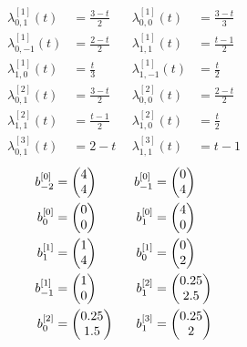 \begin{align}
	\lambda^{[1]}_{0,1}(t) &=  \frac{3-t}{2} ~~ &\lambda^{[1]}_{0,0}(t) &=  \frac{3-t}{3}\\
	\lambda^{[1]}_{0,-1}(t) &= \frac{2-t}{2} ~~ &\lambda^{[1]}_{1,1}(t) &=  \frac{t-1}{2}\\
	\lambda^{[1]}_{1,0}(t) &=  \frac{t}{3}   ~~ &\lambda^{[1]}_{1,-1}(t) &= \frac{t}{2}\\
	\lambda^{[2]}_{0,1}(t) &=  \frac{3-t}{2} ~~ &\lambda^{[2]}_{0,0}(t) &=  \frac{2-t}{2}\\
	\lambda^{[2]}_{1,1}(t) &=  \frac{t-1}{2} ~~ &\lambda^{[2]}_{1,0}(t) &=  \frac{t}{2}\\
	\lambda^{[3]}_{0,1}(t) &=  2-t           ~~ &\lambda^{[3]}_{1,1}(t) &=  t-1
\end{align}
\begin{align}
	b^{[0]}_{-2} &= \left( \begin{matrix}4 \\ 4\end{matrix}\right) ~~ &b^{[0]}_{-1} &= \left( \begin{matrix}0 \\ 4\end{matrix}\right)\\
	b^{[0]}_{0} &=  \left( \begin{matrix}0 \\ 0\end{matrix}\right) ~~ &b^{[0]}_{1} &=  \left( \begin{matrix}4 \\ 0\end{matrix}\right)\\
	b^{[1]}_{1} &=  \left( \begin{matrix}1 \\ 4\end{matrix}\right) ~~ &b^{[1]}_{0} &=  \left( \begin{matrix}0 \\ 2\end{matrix}\right)\\
	b^{[1]}_{-1} &= \left( \begin{matrix}1 \\ 0\end{matrix}\right) ~~ &b^{[2]}_{1} &= \left( \begin{matrix}0.25 \\ 2.5\end{matrix}\right)\\
	b^{[2]}_{0} &= \left( \begin{matrix}0.25 \\ 1.5\end{matrix}\right) ~~ &b^{[3]}_{1} &= \left( \begin{matrix}0.25 \\ 2\end{matrix}\right)
\end{align}

~\vspace{10pt}


